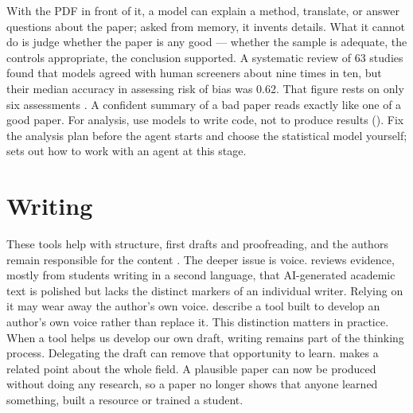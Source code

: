 With the PDF in front of it, a model can explain a method, translate, or answer
questions about the paper; asked from memory, it invents details. What it cannot
do is judge whether the paper is any good --- whether the sample is adequate, the
controls appropriate, the conclusion supported. A systematic review of 63
studies found that models agreed with human screeners about nine times in ten,
but their median accuracy in assessing risk of bias was 0.62. That figure rests
on only six assessments \parencite{laignelot2026systematicreviews}. A confident
summary of a bad paper reads exactly like one of a good paper. For analysis,
use models to write code, not to produce results
(). Fix the analysis plan before the agent
starts and choose the statistical model yourself;  sets out
how to work with an agent at this stage.

\section{Writing}

These tools help with structure, first drafts and proofreading, and the authors
remain responsible for the content \parencite{salvagno2023scientificwriting,
granjeiro2025futurewriting}. The deeper issue is voice.
\textcite{alhosni2025preservingvoice} reviews evidence, mostly from students
writing in a second language, that AI-generated academic text is polished but
lacks the distinct markers of an individual writer. Relying on it may wear away
the author's own voice. \textcite{singh2025authorialvoice} describe a tool built
to develop an author's own voice rather than replace it. This distinction
matters in practice. When a tool helps us develop our own draft, writing remains
part of the thinking process. Delegating the draft can remove that opportunity
to learn. \textcite{blekhman2026purpose} makes a related point about the whole
field. A plausible paper can now be produced without doing any research, so a
paper no longer shows that anyone learned something, built a resource or trained
a student.

